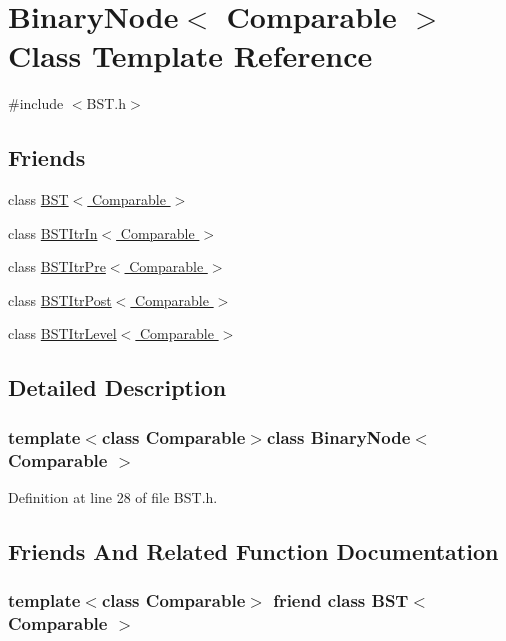 \hypertarget{class_binary_node}{\section{Binary\-Node$<$ Comparable $>$ Class Template Reference}
\label{class_binary_node}
}


{\ttfamily \#include $<$B\-S\-T.\-h$>$}

\subsection*{Friends}
\begin{DoxyCompactItemize}
\item 
class \hyperlink{class_binary_node_a28a1adb9906f3ff7e12c2cb6fa2bd54e}{B\-S\-T$<$ Comparable $>$}
\item 
class \hyperlink{class_binary_node_aab3993acac2ab24a0b59edb0c3acc775}{B\-S\-T\-Itr\-In$<$ Comparable $>$}
\item 
class \hyperlink{class_binary_node_a45a55df6f11541416d4ea7684c575c1a}{B\-S\-T\-Itr\-Pre$<$ Comparable $>$}
\item 
class \hyperlink{class_binary_node_a5dc153694be266f6e772659486219da7}{B\-S\-T\-Itr\-Post$<$ Comparable $>$}
\item 
class \hyperlink{class_binary_node_a26ff00bc0d87069aed877f10fd3c80a8}{B\-S\-T\-Itr\-Level$<$ Comparable $>$}
\end{DoxyCompactItemize}


\subsection{Detailed Description}
\subsubsection*{template$<$class Comparable$>$class Binary\-Node$<$ Comparable $>$}



Definition at line 28 of file B\-S\-T.\-h.



\subsection{Friends And Related Function Documentation}
\hypertarget{class_binary_node_a28a1adb9906f3ff7e12c2cb6fa2bd54e}{
\subsubsection[{B\-S\-T$<$ Comparable $>$}]{\setlength{\rightskip}{0pt plus 5cm}template$<$class Comparable$>$ friend class {\bf B\-S\-T}$<$ Comparable $>$\hspace{0.3cm}{\ttfamily [friend]}}}\label{class_binary_node_a28a1adb9906f3ff7e12c2cb6fa2bd54e}


